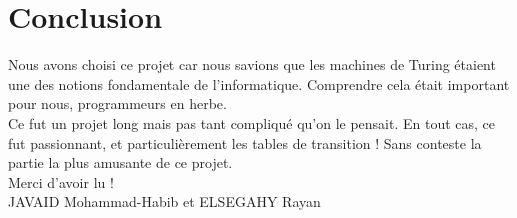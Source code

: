 \documentclass[a4paper,10pt]{article}
\begin{document}
\section{Conclusion}
    Nous avons choisi ce projet car nous savions que les machines de Turing étaient une des notions fondamentale de l'informatique. Comprendre cela était important pour nous, programmeurs en herbe.
    \\[1 em] 
    Ce fut un projet long mais pas tant compliqué qu'on le pensait. En tout cas, ce fut passionnant, et particulièrement les tables de transition ! Sans conteste la partie la plus amusante de ce projet.
    \\[1 em] 
    Merci d'avoir lu !
    \\[1 em] 
    JAVAID Mohammad-Habib et ELSEGAHY Rayan
\end{document}
